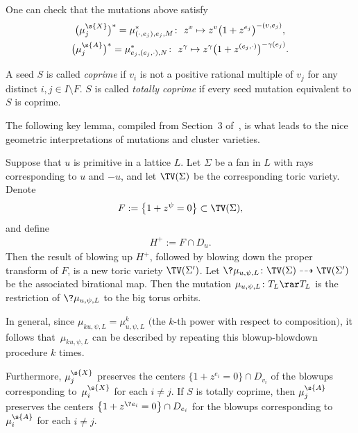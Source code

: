 One can check that the mutations above satisfy
\begin{gather*}%
	\big(\mu_j^{\s{X}}\big)^*=\mu_{(\cdot,e_j),e_j,M}^*\colon \ z^{v} \mapsto z^{v}\big(1+z^{e_j}\big)^{-(v,e_j)},\\
	\big(\mu_j^{\s{A}}\big)^*=\mu_{e_j,( e_j,\cdot ),N}^*\colon \ z^{\gamma} \mapsto z^{\gamma}\big(1+z^{( e_j,\cdot)}\big)^{-\gamma(e_j)}.
\end{gather*}

\begin{dfn}\label{coprime}A seed $S$ is called {\it coprime} if $v_i$ is not a positive rational multiple of $v_j$ for any distinct $i,j \in I\setminus F$. $S$ is called {\it totally coprime} if every seed mutation equivalent to $S$ is coprime.
\end{dfn}

The following key lemma, compiled from Section~3 of~\cite{GHK3}, is what leads to the nice geometric interpretations of mutations and cluster varieties.

\begin{lem}\label{mugeom}Suppose that $u$ is primitive in a lattice $L$. Let $\Sigma$ be a fan in $L$ with rays corresponding to $u$ and $-u$, and let $\TV(\Sigma)$ be the corresponding toric variety. Denote
\begin{gather*}
 F:=\big\{1+z^{\psi}=0\big\}\subset \TV(\Sigma),
\end{gather*}
and define
\begin{gather*}
H^+:=F\cap D_{u}.
\end{gather*}
Then the result of blowing up $H^+$, followed by blowing down the proper transform of $F$, is a new toric variety $\TV(\Sigma')$. Let $\?{\mu}_{u,\psi,L}\colon \TV(\Sigma)\dashrightarrow \TV(\Sigma')$ be the associated birational map. Then the mutation $\mu_{u,\psi,L}\colon T_L\rar T_L$ is the restriction of $\?{\mu}_{u,\psi,L}$ to the big torus orbits.

In general, since $\mu_{ku,\psi,L}=\mu_{u,\psi,L}^k$ $($the $k$-th power with respect to composition$)$, it follows that~$\mu_{ku,\psi,L}$ can be described by repeating this blowup-blowdown procedure $k$ times.

Furthermore, $\mu_j^{\s{X}}$ preserves the centers $\big\{1+z^{e_i}=0\big\}\cap D_{v_i}$ of the blowups corresponding to~$\mu_i^{\s{X}}$ for each $i \neq j$. If $S$ is totally coprime, then $\mu_j^{\s{A}}$ preserves the centers $\big\{1+z^{\?{e_i}}=0\big\}\cap D_{e_i}$ for the blowups corresponding to $\mu_i^{\s{A}}$ for each $i \neq j$.
\end{lem}

